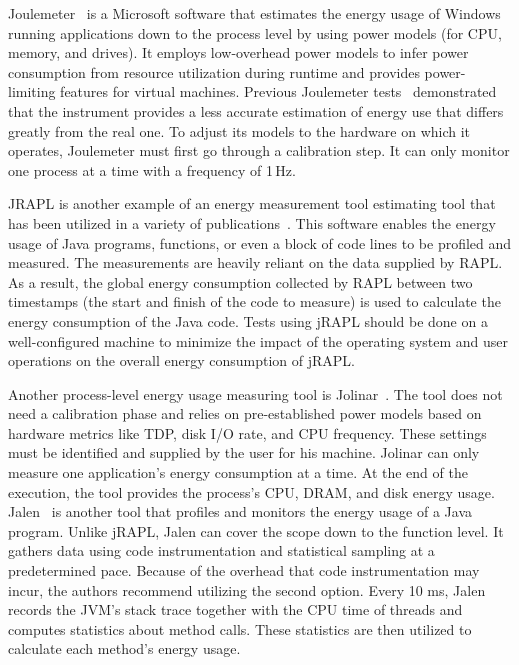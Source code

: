 Joulemeter~\cite{kothari2009joulemeter,jagroep2017energy} is a Microsoft software that estimates the energy usage of Windows running applications down to the process level by using power models (for CPU, memory, and drives).
It employs low-overhead power models to infer power consumption from resource utilization during runtime and provides power-limiting features for virtual machines.
Previous Joulemeter tests~\cite{jagroep2015profiling} demonstrated that the instrument provides a less accurate estimation of energy use that differs greatly from the real one.
To adjust its models to the hardware on which it operates, Joulemeter must first go through a calibration step.
It can only monitor one process at a time with a frequency of 1\,Hz.

JRAPL is another example of an energy measurement tool estimating tool that has been utilized in a variety of publications~\cite{guimaraes2016some,liu_data-oriented_2015}.
This software enables the energy usage of Java programs, functions, or even a block of code lines to be profiled and measured.
The measurements are heavily reliant on the data supplied by RAPL.
As a result, the global energy consumption collected by RAPL between two timestamps (the start and finish of the code to measure) is used to calculate the energy consumption of the Java code.
Tests using jRAPL should be done on a well-configured machine to minimize the impact of the operating system and user operations on the overall energy consumption of jRAPL.

Another process-level energy usage measuring tool is Jolinar~\cite{islam2016measuring,noureddine2016jolinar}.
The tool does not need a calibration phase and relies on pre-established power models based on hardware metrics like TDP, disk I/O rate, and CPU frequency.
These settings must be identified and supplied by the user for his machine.
Jolinar can only measure one application's energy consumption at a time.
At the end of the execution, the tool provides the process's CPU, DRAM, and disk energy usage.
Jalen~\cite{noureddine2015monitoring} is another tool that profiles and monitors the energy usage of a Java program.
Unlike jRAPL, Jalen can cover the scope down to the function level.
It gathers data using code instrumentation and statistical sampling at a predetermined pace.
Because of the overhead that code instrumentation may incur, the authors recommend utilizing the second option.
Every 10 ms, Jalen records the JVM's stack trace together with the CPU time of threads and computes statistics about method calls.
These statistics are then utilized to calculate each method's energy usage.


